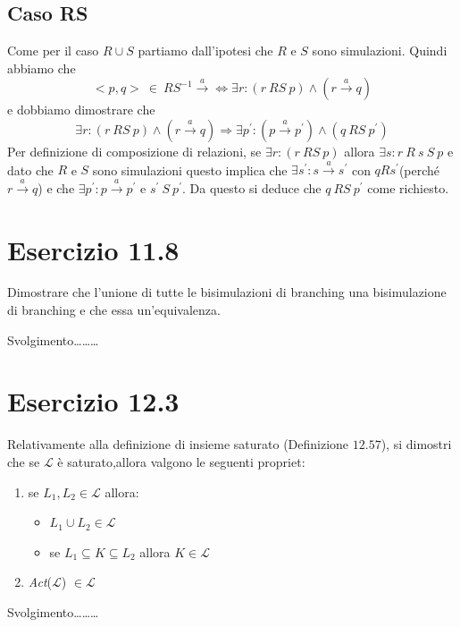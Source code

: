 		\subsection{Caso RS}
		
		Come per il caso $R\cup S$ partiamo dall'ipotesi che $R$ e $S$ sono simulazioni. Quindi abbiamo che $$<p,q>\ \in \ RS^{-1} \xrightarrow{a}  \Leftrightarrow \exists r: (r \ RS \ p) \land (r \xrightarrow{a} q)$$
		e dobbiamo dimostrare che
		$$\exists r: (r \ RS \ p) \land (r \xrightarrow{a} q) \Rightarrow \exists p^{'}: (p \xrightarrow{a} p^{'}) \land (q \ RS \ p^{'})$$
		Per definizione di composizione di relazioni, se $\exists r: (r \ RS \ p)$ allora $\exists s: r\ R\ s\ S\ p$ e dato che $R$ e $S$ sono simulazioni questo implica che $\exists s^{'}: s \xrightarrow{a} s^{'}$ con $q R s^{'}$(perch\'e $r \xrightarrow{a}q$) e che $\exists p^{'}: p \xrightarrow{a} p^{'}$ e $s^{'}\ S\ p^{'}$. Da questo si deduce che $q\ RS\ p^{'}$ come richiesto.
			
		\newpage
		
	\section{Esercizio 11.8}
		Dimostrare che l'unione di tutte le bisimulazioni di branching \eacc una
		bisimulazione di branching e che essa \eacc un'equivalenza.
		
		\sectionline
		
		Svolgimento\ldots\ldots\ldots
		
		\newpage
		
	\section{Esercizio 12.3}
		\quad Relativamente alla definizione di insieme saturato (Definizione $12.57$), si dimostri che se $\mathcal{L}$ \`e saturato,allora valgono le
		seguenti propriet\aacc :
		\begin{enumerate}
		  \item se $L_1,L_2 \in \mathcal{L}$ allora:
		  \begin{itemize}
		    \item $L_1 \cup L_2 \in \mathcal{L}$
		    \item se $L_1 \subseteq K \subseteq L_2$ allora $K \in \mathcal{L}$
		  \end{itemize}
		  \item \emph{Act}($\mathcal{L}$) $\in \mathcal{L}$
		\end{enumerate}
		
		\sectionline
		
		Svolgimento\ldots\ldots\ldots